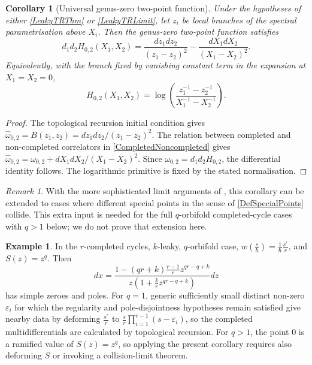 \documentclass[10pt,a4paper,oneside,no-math,reqno]{amsart}%
\theoremstyle{plain}
\newtheorem{corollary}[theorem]{Corollary}
\theoremstyle{definition}
\newtheorem{example}[theorem]{Example}
\theoremstyle{remark}
\newtheorem{remark}[theorem]{Remark}
\numberwithin{equation}{section}
\renewcommand{\epsilon}{\varepsilon}
\newcommand{\1}{\mathds{1}}
\newcommand{\<}{\langle}
\renewcommand{\>}{\rangle}
\begin{document}
\begin{corollary}[Universal genus-zero two-point function]\label{UniversalTwoPoint}
    Under the hypotheses of either \cref{LeakyTRThm} or \cref{LeakyTRLimit}, let $z_i$ be local branches of the spectral parametrisation above $X_i$. Then the genus-zero two-point function satisfies
    \begin{equation}
        d_1d_2 H_{0,2}(X_1,X_2)
        =
        \frac{dz_1dz_2}{(z_1-z_2)^2}
        -
        \frac{dX_1dX_2}{(X_1-X_2)^2}.
    \end{equation}
    Equivalently, with the branch fixed by vanishing constant term in the expansion at $X_1=X_2=0$,
    \begin{equation}
        H_{0,2}(X_1,X_2)
        =
        \log\left(
        \frac{z_1^{-1}-z_2^{-1}}{X_1^{-1}-X_2^{-1}}
        \right).
    \end{equation}
\end{corollary}

\begin{proof}
    The topological recursion initial condition gives $\widehat{\omega}_{0,2}=B(z_1,z_2)=dz_1dz_2/(z_1-z_2)^2$. The relation between completed and non-completed correlators in \cref{CompletedNoncompleted} gives $\widehat{\omega}_{0,2}=\omega_{0,2}+dX_1dX_2/(X_1-X_2)^2$. Since $\omega_{0,2}=d_1d_2H_{0,2}$, the differential identity follows. The logarithmic primitive is fixed by the stated normalisation.
\end{proof}

\begin{remark}
    With the more sophisticated limit arguments of \cite{BBCKS25,ABDKS25}, this corollary can be extended to cases where different special points in the sense of \cref{DefSpecialPoints} collide. This extra input is needed for the full $q$-orbifold completed-cycle cases with $q>1$ below; we do not prove that extension here.
\end{remark}

\begin{example}
    In the $r$-completed cycles, $k$-leaky, $q$-orbifold case, $ w(\frac{s}{\hbar}) = \frac{1}{\hbar} \frac{s^r}{r}$, and $ S(z) = z^q$. Then
    \begin{equation}
		dx
		=
		\frac{1 - (qr+k) \frac{r-1}{r} z^{qr - q +k }}{z ( 1 + \frac{k}{r} z^{qr-q + k} )} dz
	\end{equation}
    has simple zeroes and poles. For $q=1$, generic sufficiently small distinct non-zero $\epsilon_i$ for which the regularity and pole-disjointness hypotheses remain satisfied give nearby data by deforming $\frac{s^r}{r}$ to $\frac{s}{r}\prod_{i=1}^{r-1}(s-\epsilon_i)$, so the completed multidifferentials are calculated by topological recursion. For $q>1$, the point $0$ is a ramified value of $S(z)=z^q$, so applying the present corollary requires also deforming $S$ or invoking a collision-limit theorem.
\end{example}
\end{document}
